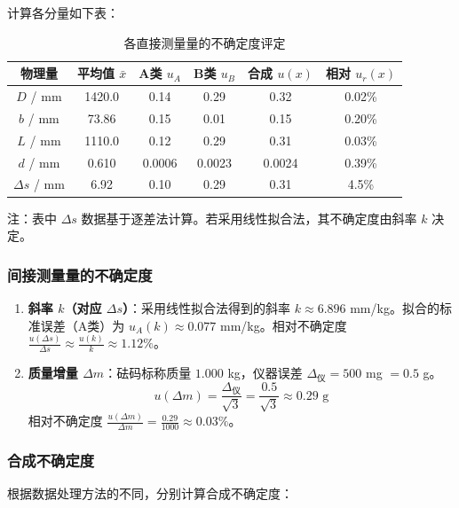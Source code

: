 \documentclass[]{../../templates/Report}%
\begin{document}
\begin{fullreportonly}
    计算各分量如下表：
    \begin{table}[H]
        \centering
        \caption{各直接测量量的不确定度评定}
        \small
        \begin{tabular}{cccccc}
            \toprule
            物理量             & 平均值 $\bar{x}$ & A类 $u_A$ & B类 $u_B$ & 合成 $u(x)$ & 相对 $u_r(x)$ \\
            \midrule
            $D$ / mm        & 1420.0        & 0.14     & 0.29     & 0.32      & 0.02\%      \\
            $b$ / mm        & 73.86         & 0.15     & 0.01     & 0.15      & 0.20\%      \\
            $L$ / mm        & 1110.0        & 0.12     & 0.29     & 0.31      & 0.03\%      \\
            $d$ / mm        & 0.610         & 0.0006   & 0.0023   & 0.0024    & 0.39\%      \\
            $\Delta s$ / mm & 6.92          & 0.10     & 0.29     & 0.31      & 4.5\%       \\
            \bottomrule
        \end{tabular}
    \end{table}
    注：表中 $\Delta s$ 数据基于逐差法计算。若采用线性拟合法，其不确定度由斜率 $k$ 决定。

    \subsubsection{间接测量量的不确定度}
    \begin{enumerate}
        \item \textbf{斜率 $k$（对应 $\Delta s$）}：采用线性拟合法得到的斜率 $k \approx 6.896$ mm/kg。拟合的标准误差（A类）为 $u_A(k) \approx 0.077$ mm/kg。相对不确定度 $\frac{u(\Delta s)}{\Delta s} \approx \frac{u(k)}{k} \approx 1.12\%$。
        \item \textbf{质量增量 $\Delta m$}：砝码标称质量 $1.000$ kg，仪器误差 $\Delta_{\text{仪}} = 500$ mg $= 0.5$ g。
              \[ u(\Delta m) = \frac{\Delta_{\text{仪}}}{\sqrt{3}} = \frac{0.5}{\sqrt{3}} \approx 0.29 \text{ g} \]
              相对不确定度 $\frac{u(\Delta m)}{\Delta m} = \frac{0.29}{1000} \approx 0.03\%$。
    \end{enumerate}

    \subsubsection{合成不确定度}
    根据数据处理方法的不同，分别计算合成不确定度：


\end{fullreportonly}
\end{document}
